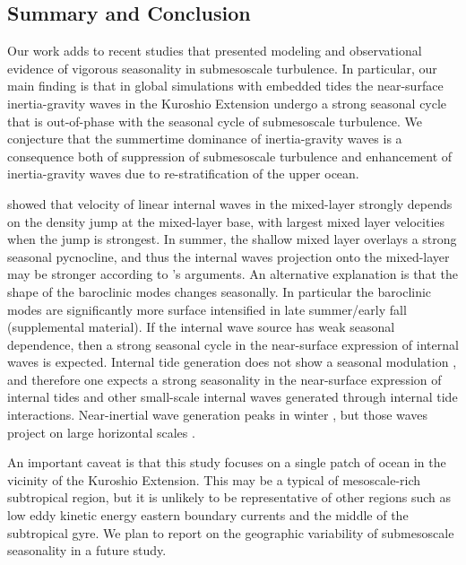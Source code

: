 \documentclass[grl]{agutex2015}
\begin{document}
\begin{article}
\section{Summary and Conclusion}
Our work adds to recent studies that presented modeling \citep{sasaki_etal2014}
and observational \citep{callies_etal2015,buckingham_etal2016} evidence of vigorous seasonality in
submesoscale turbulence. In particular, our main finding is that in global simulations with embedded tides the
near-surface inertia-gravity waves in the Kuroshio Extension undergo
a strong seasonal cycle that is out-of-phase with the seasonal cycle of
submesoscale turbulence. We conjecture that the summertime dominance of inertia-gravity waves
 \citep{callies_etal2015} is a consequence both of suppression of submesoscale turbulence and
enhancement of inertia-gravity waves due to re-stratification of
the upper ocean.

\cite{dasaro1978} showed that velocity of linear internal waves
in the mixed-layer strongly depends on the density jump at the mixed-layer
base, with largest mixed layer velocities when the jump is strongest.
In summer, the shallow mixed layer overlays a strong seasonal pycnocline,
and thus the internal waves projection onto the mixed-layer may be stronger
according to \cite{dasaro1978}'s arguments. An
alternative explanation is that the shape of the baroclinic modes
changes seasonally. In particular the baroclinic modes are
significantly more surface intensified in late summer/early fall
 (supplemental material).
If the internal wave source has weak seasonal dependence, then a strong
seasonal cycle in the near-surface expression of internal waves is expected.
Internal tide generation does not show a seasonal modulation \citep[e.g.,][]{alford2003},
and therefore one expects a strong seasonality in the near-surface
expression of internal tides and
other small-scale internal waves generated through internal tide interactions.
Near-inertial wave generation peaks in winter \citep[e.g.,][]{alford2003}, but
those waves project on large horizontal scales \citep[e.g, ][]{qi_etal1995}.

An important caveat is that this study focuses on a single patch of ocean in the
vicinity of the Kuroshio Extension. This may be a typical of mesoscale-rich
subtropical region, but it is unlikely to be
representative of other regions such as low eddy kinetic energy eastern boundary currents
and the middle of the subtropical gyre.  We plan to report on the geographic variability of submesoscale
 seasonality in a future study.


\end{article}
\end{document}
